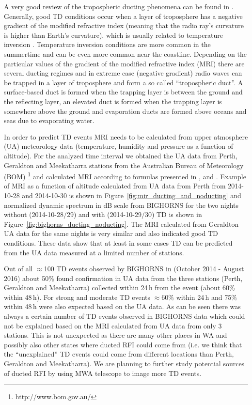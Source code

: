 \documentclass{article}
\begin{document}
A very good review of the tropospheric ducting phenomena can be found in \citep{tropo_ducting}.
Generally, good TD conditions occur when a layer of troposphere has a negative gradient of the modified refractive index (meaning that the radio ray's curvature is higher than Earth's curvature), which is usually related to temperature inversion \citep{tropo_ducting}.
Temperature inversion conditions are more common in the summertime and can be even more common near the coastline.
Depending on the particular values of the gradient of the modified refractive index (MRI) there are several ducting regimes and in extreme case (negative gradient) radio waves can be trapped in a layer of troposphere and form a so called ``tropospheric duct''.
A surface-based duct is formed when the trapping layer is between the ground and the reflecting layer, an elevated duct is formed when the trapping layer is somewhere above the ground and evaporation ducts are formed above oceans and seas due to evaporating water. 

In order to predict TD events MRI needs to be calculated from upper atmosphere (UA) meteorology data (temperature, humidity and pressure as a function of altitude). 
For the analyzed time interval we obtained the UA data from Perth, Geraldton and Meekatharra stations from the Australian Bureau of Meteorology (BOM) \footnote{http://www.bom.gov.au/}
and calculated MRI according to formulas presented in \citep{ITUR_453}, \citep{ITUR_835} and \citep{hajime_suzuki}.
Example of MRI as a function of altitude calculated from UA data from Perth from 2014-10-28 and 2014-10-30 is shown in 
Figure~\ref{fig:mir_ducting_and_noducting} and normalized dynamic spectrum in dB scale from BIGHORNS for the two nights without
(2014-10-28/29) and with (2014-10-29/30) TD is shown in Figure~\ref{fig:bighorns_ducting_noducting}.
The MRI calculated from Geraldton UA data for the same nights is very similar and also indicated good TD conditions. 
These data show that at least in some cases TD can be predicted from the UA data measured at a limited number of stations.


Out of all $\approx$100 TD events observed by BIGHORNS in (October 2014 - August 2016) about 50\% found confirmation in UA data from the three stations (Perth, Geraldton and Meekatharra) collected within 24\,h from the event (about 60\% within 48\,h).
For strong and moderate TD events $\approx$60\% within 24\,h and 75\% within 48\,h were also expected based on the UA data. As can be seen there was always a certain number of TD events observed in BIGHORNS data which could not be explained based on the MRI calculated from UA data from only 3 stations.
This is not unexpected as there are many other places in WA and possibly also other states where ducted RFI could come from (i.e. we think that the ``unexplained'' TD events could come from different locations than Perth, Geraldton and Meekatharra).
We are planning to further study potential sources of ducted RFI by using MWA telescope to image more TD events.
\end{document}
